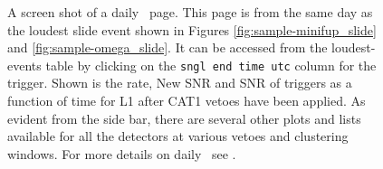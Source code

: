 \begin{figure}[p]
\label{fig:sample-daily_ihope-slide}
\center
{}
\caption{A screen shot of a daily \ihope~page. This page is from the same day
as the loudest slide event shown in Figures \ref{fig:sample-minifup_slide} and
\ref{fig:sample-omega_slide}. It can be accessed from the loudest-events table
by clicking on the \texttt{sngl end time utc} column for the trigger. Shown is the
rate, New \ac{SNR} and \ac{SNR} of triggers as a function of time for L1 after
CAT1 vetoes have been applied. As evident from the side bar, there are several
other plots and lists available for all the detectors at various vetoes and
clustering windows. For more details on daily \ihope~see \cite{Pekowsky:thesis}.}
\end{figure}

